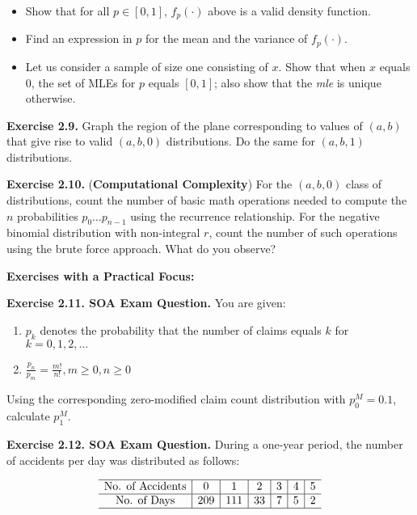\documentclass[]{book}
\providecommand{\tightlist}{%
  \setlength{\itemsep}{0pt}\setlength{\parskip}{0pt}}
\theoremstyle{definition}
\theoremstyle{definition}
\theoremstyle{definition}
\theoremstyle{remark}
\begin{document}
\begin{itemize}
\tightlist
\item
  Show that for all \(p\in[0,1]\), \(f_p(\cdot)\) above is a valid
  density function.
\item
  Find an expression in \(p\) for the mean and the variance of
  \(f_p(\cdot)\).
\item
  Let us consider a sample of size one consisting of \(x\). Show that
  when \(x\) equals \(0\), the set of MLEs for \(p\) equals \([0,1]\);
  also show that the \emph{mle} is unique otherwise.
\end{itemize}

\textbf{Exercise 2.9.} Graph the region of the plane corresponding to
values of \((a,b)\) that give rise to valid \((a,b,0)\) distributions.
Do the same for \((a,b,1)\) distributions.

\textbf{Exercise 2.10.} (\textbf{Computational Complexity}) For the
\((a,b,0)\) class of distributions, count the number of basic math
operations needed to compute the \(n\) probabilities
\(p_0\ldots p_{n-1}\) using the recurrence relationship. For the
negative binomial distribution with non-integral \(r\), count the number
of such operations using the brute force approach. What do you observe?

\textbf{Exercises with a Practical Focus:}

\textbf{Exercise 2.11. SOA Exam Question.} You are given:

\begin{enumerate}
\def\labelenumi{\arabic{enumi}.}
\tightlist
\item
  \(p_k\) denotes the probability that the number of claims equals \(k\)
  for \(k=0,1,2,\ldots\)
\item
  \(\frac{p_n}{p_m}=\frac{m!}{n!}, m\ge 0, n\ge 0\)
\end{enumerate}

Using the corresponding zero-modified claim count distribution with
\(p_0^M=0.1\), calculate \(p_1^M\).

\textbf{Exercise 2.12. SOA Exam Question.} During a one-year period, the
number of accidents per day was distributed as follows:

\[
\begin{matrix}
\begin{array}{c|c|c|c|c|c|c}
\hline
\text{No. of Accidents} & 0 & 1 & 2 & 3 & 4 & 5\\
\hline
\text{No. of Days} & 209 & 111 & 33 & 7 & 5 & 2\\
\hline
\end{array}
\end{matrix}
\]
\end{document}
